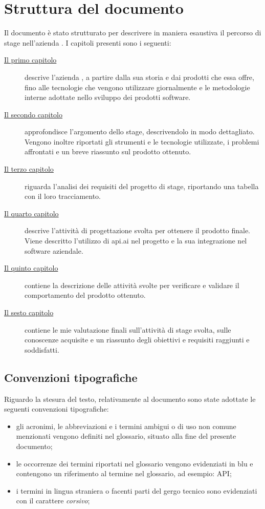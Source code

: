 \section{Struttura del documento}
Il documento è stato strutturato per descrivere in maniera esaustiva il percorso di stage nell'azienda \azienda{}. I capitoli presenti sono i seguenti:

\begin{description}
    \item[{\hyperref[cap:contesto-aziendale]{Il primo capitolo}}] descrive l'azienda \azienda{}, a partire dalla sua storia e dai prodotti che essa offre, fino alle tecnologie che vengono utilizzare giornalmente e le metodologie interne adottate nello sviluppo dei prodotti software. 
    
    \item[{\hyperref[cap:progetto-stage]{Il secondo capitolo}}] approfondisce l'argomento dello stage, descrivendolo in modo dettagliato. Vengono inoltre riportati gli strumenti e le tecnologie utilizzate, i problemi affrontati e un breve riassunto sul prodotto ottenuto.
    
    \item[{\hyperref[cap:analisi]{Il terzo capitolo}}] riguarda l'analisi dei requisiti del progetto di stage, riportando una tabella con il loro tracciamento.
    
    \item[{\hyperref[cap:progettazione]{Il quarto capitolo}}] descrive l'attività di progettazione svolta per ottenere il prodotto finale. Viene descritto l'utilizzo di api.ai nel progetto e la sua integrazione nel software aziendale.
    
    \item[{\hyperref[cap:verifica]{Il quinto capitolo}}] contiene la descrizione delle attività svolte per verificare e validare il comportamento del prodotto ottenuto.
    
    \item[{\hyperref[cap:conclusioni]{Il sesto capitolo}}] contiene le mie valutazione finali sull'attività di stage svolta, sulle conoscenze acquisite e un riassunto degli obiettivi e requisiti raggiunti e soddisfatti.

\end{description}

\subsection{Convenzioni tipografiche}
Riguardo la stesura del testo, relativamente al documento sono state adottate le seguenti convenzioni tipografiche:
\begin{itemize}
	\item gli acronimi, le abbreviazioni e i termini ambigui o di uso non comune menzionati vengono definiti nel glossario, situato alla fine del presente documento;
	\item le occorrenze dei termini riportati nel glossario vengono evidenziati in blu e contengono un riferimento al termine nel glossario, ad esempio: \gls{API};
	\item i termini in lingua straniera o facenti parti del gergo tecnico sono evidenziati con il carattere \emph{corsivo};
\end{itemize}